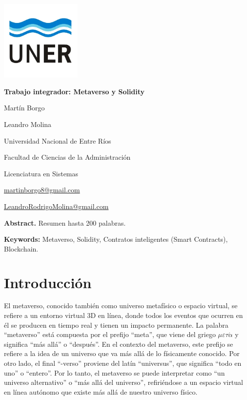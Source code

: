\documentclass[a4paper,10pt]{article}
\begin{document}
	\pagestyle{empty}
	\begin{titlepage}
		\centering
		\vspace*{1.5cm}
		\includegraphics[width=0.3\textwidth]{unerlogo.png}
		\linebreak
		{\fontsize{14}{17}\bfseries Trabajo integrador: Metaverso y Solidity\par}
		{\small Martín Borgo\par}
		{\small Leandro Molina\par}
		{\normalsize Universidad Nacional de Entre Ríos\par}
		{\normalsize Facultad de Ciencias de la Administración\par}
		{\normalsize Licenciatura en Sistemas \par}
		{\small \href{mailto:martinborgo8@gmail.com}{martinborgo8@gmail.com}\par}
		{\small \href{mailto:LeandroRodrigoMolina@gmail.com}{LeandroRodrigoMolina@gmail.com}\par}
		
		{\small \textbf{Abstract.} Resumen hasta 200 palabras. \par}
		{\small \textbf{Keywords:} Metaverso, Solidity, Contratos inteligentes (Smart Contracts), Blockchain.\par}
	\end{titlepage}
	
	\tableofcontents
	\thispagestyle{empty}
	\section{Introducción}
	El metaverso, conocido también como universo metafísico o espacio virtual, se refiere a un entorno virtual 3D en línea, donde todos los eventos que ocurren en él se producen en tiempo real y tienen un impacto permanente. La palabra “metaverso” está compuesta por el prefijo “meta”, que viene del griego \( \mu\varepsilon\tau\acute{\alpha} \) y significa “más allá” o “después”. En el contexto del metaverso, este prefijo se refiere a la idea de un universo que va más allá de lo físicamente conocido. Por otro lado, el final “-verso” proviene del latín “universus”, que significa “todo en uno” o “entero”. Por lo tanto, el metaverso se puede interpretar como “un universo alternativo” o “más allá del universo”, refiriéndose a un espacio virtual en línea autónomo que existe más allá de nuestro universo físico.
	
\end{document}
